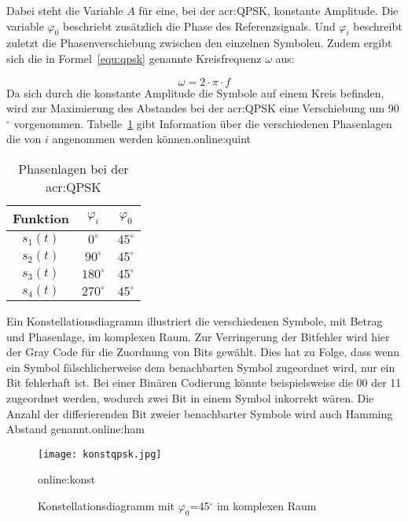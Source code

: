 Dabei steht die Variable $A$ für eine, bei der \gls{acr:QPSK}, konstante Amplitude. Die variable $\varphi_{0}$ beschriebt zusätzlich die Phase des Referenzsignals. Und $\varphi_{i}$ beschreibt zuletzt die Phasenverschiebung zwischen den einzelnen Symbolen. Zudem ergibt sich die in Formel~\ref{equ:qpsk} genannte Kreisfrequenz $\omega$ aus:

\begin{equation}
	\label{equ:omega}
	\omega = 2 \cdot \pi \cdot f
\end{equation}
Da sich durch die konstante Amplitude die Symbole auf einem Kreis befinden, wird zur Maximierung des Abstandes bei der \gls{acr:QPSK} eine Verschiebung um 90$^\circ$ vorgenommen. Tabelle~\ref{tab:qpsk} gibt Information über die verschiedenen Phasenlagen die von $i$ angenommen werden können.\gls{online:quint}
\begin{table}[htb]
\centering
		\begin{tabular}[h]{ccc}	
			\toprule
			Funktion & $\varphi_{i}$& $\varphi_{0}$ \\
			\midrule
			$s_{1}(t)$ & $0^\circ$ & $45^\circ$ \\
			$s_{2}(t)$ & $90^\circ$ & $45^\circ$\\
			$s_{3}(t)$ & $180^\circ$ & $45^\circ$\\
			$s_{4}(t)$ & $270^\circ$& $45^\circ$ \\
			\bottomrule
		\end{tabular}
		\caption{Phasenlagen bei der \gls{acr:QPSK}}
		\label{tab:qpsk}
\end{table}

Ein Konstellationsdiagramm illustriert die verschiedenen Symbole, mit Betrag und Phasenlage, im komplexen Raum. Zur Verringerung der Bitfehler wird hier der Gray Code für die Zuordnung von Bits gewählt. Dies hat zu Folge, dass wenn ein Symbol fälschlicherweise dem benachbarten Symbol zugeordnet wird, nur ein Bit fehlerhaft ist. Bei einer Binären Codierung könnte beispielsweise die 00 der 11 zugeordnet werden, wodurch zwei Bit in einem Symbol inkorrekt wären. Die Anzahl der differierenden Bit zweier benachbarter Symbole wird auch Hamming Abstand genannt.\gls{online:ham}

\begin{figure}[H]
	\centering
	\texttt{[image: konstqpsk.jpg]}
	\caption[Konstellationsdiagramm mit $\varphi_{0}$=$45^\circ$ im komplexen Raum]{Konstellationsdiagramm mit $\varphi_{0}$=45$^\circ$ im komplexen Raum} 
	\gls{online:konst}
	\label{fig:konstqpsk}
\end{figure}

